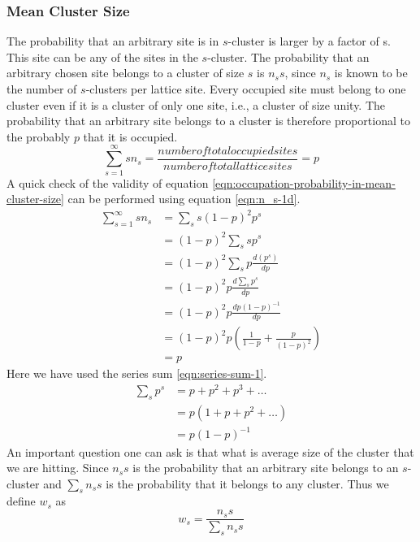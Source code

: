 		\subsubsection{Mean Cluster Size}
		The probability that an arbitrary site is in $s$-cluster is larger by a factor of s. This site can be any of the sites in the $s$-cluster. The probability that an arbitrary chosen site belongs to a cluster of size $s$ is $n_s s$, since $n_s$ is known to be the number of $s$-clusters per lattice site. Every occupied site must belong to one cluster even if it is a cluster of only one site, i.e., a cluster of size unity.  The probability that an arbitrary site belongs to a cluster is therefore proportional to the probably
		$p$ that it is occupied.
		\begin{equation}
			\sum_{s=1}^{\infty} s n_s = \frac{number of total occupied sites}{number of total lattice sites} = p
			\label{eqn:occupation-probability-in-mean-cluster-size}
		\end{equation}
		A quick check of the validity of equation \ref{eqn:occupation-probability-in-mean-cluster-size} can be performed using equation \ref{eqn:n_s-1d}.
		\begin{align}
			\sum_{s=1}^{\infty}	s n_s \nonumber
			&=  \sum_{s} s (1-p)^2 p^s \nonumber \\
			&= (1-p)^2 \sum_{s} s p^s  \nonumber \\
			&= (1-p)^2 \sum_{s} p \frac{d(p^s)}{dp} \nonumber \\
			&= (1-p)^2 p \frac{d \sum_{s} p^s}{dp} \nonumber \\
			&= (1-p)^2 p \frac{d p(1-p)^{-1}}{dp} \nonumber \\
			&= (1-p)^2 p \left(\frac{1}{1-p} + \frac{p}{(1-p)^2}\right) \nonumber \\
			&= p 
		\end{align}
		Here we have used the series sum \ref{eqn:series-sum-1}.
		\begin{align}
			\sum_s p^s 
			&= p + p^2 + p^3 + \ldots \nonumber \\
			&= p( 1 + p + p^2 + \ldots) \nonumber \\
			&= p(1-p)^{-1}
			\label{eqn:series-sum-1}
		\end{align}
		An important question one can ask is that what is average size of the cluster that we are hitting. Since $n_s s$ is the probability that an arbitrary site belongs to an $s$-cluster and $\sum_{s} n_s s$ is the probability that it belongs to any cluster. Thus we define $w_s$ as
		\begin{equation}
			w_s = \frac{n_s s}{\sum_{s} n_s s}
			\label{eqn:arbitrary-cluster-exactly-s-sites}
		\end{equation}

